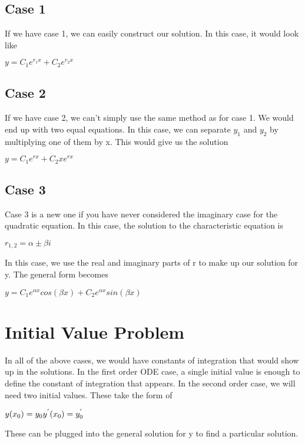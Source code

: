 \documentclass[
  letterpaper,
]{report}
\begin{document}
\subsection{Case 1}\label{case-1}

If we have case 1, we can easily construct our solution. In this case,
it would look like

\(y = C_1 e^{r_1 x} + C_2 e^{r_2 x}\)

\subsection{Case 2}\label{case-2}

If we have case 2, we can't simply use the same method as for case 1. We
would end up with two equal equations. In this case, we can separate
\(y_1\) and \(y_2\) by multiplying one of them by x. This would give us
the solution

\(y = C_1 e^{r x} + C_2 x e^{r x}\)

\subsection{Case 3}\label{case-3}

Case 3 is a new one if you have never considered the imaginary case for
the quadratic equation. In this case, the solution to the characteristic
equation is

\(r_{1,2} = \alpha \pm \beta i\)

In this case, we use the real and imaginary parts of r to make up our
solution for y. The general form becomes

\(y = C_1 e^{\alpha x} cos(\beta x) + C_2 e^{\alpha x} sin(\beta x)\)

\section{Initial Value Problem}\label{initial-value-problem}

In all of the above cases, we would have constants of integration that
would show up in the solutions. In the first order ODE case, a single
initial value is enough to define the constant of integration that
appears. In the second order case, we will need two initial values.
These take the form of

\(y(x_0) = y_0 \\
y^{'}(x_0) = y^{'}_0\)

These can be plugged into the general solution for y to find a
particular solution.
\end{document}
